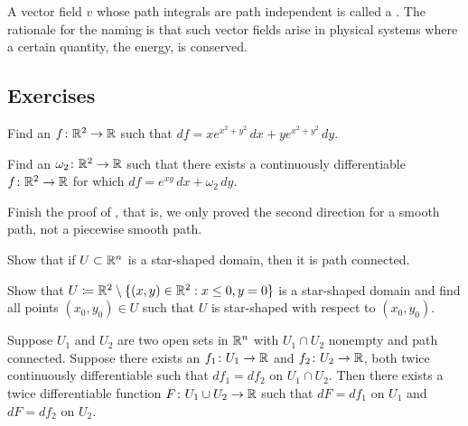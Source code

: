 A vector field $v$ whose path integrals are path independent is called
a \emph{}.  The rationale for the naming
is that such vector fields arise in physical systems
where a certain quantity, the energy, is conserved.

\subsection{Exercises}

\begin{exercise}
Find an $f \colon {\mathbb{R}}^2 \to {\mathbb{R}}$ such that $df = xe^{x^2+y^2}\, dx +
ye^{x^2+y^2} \, dy$.
\end{exercise}

\begin{exercise}
Find an $\omega_2 \colon {\mathbb{R}}^2 \to {\mathbb{R}}$ such that
there exists a continuously differentiable $f \colon {\mathbb{R}}^2 \to {\mathbb{R}}$
for which
$df = e^{xy} \,dx + \omega_2 \,dy$.
\end{exercise}

\begin{exercise}
Finish the proof of , that is, we only proved the
second direction for a smooth path, not a piecewise smooth path.
\end{exercise}

\begin{exercise}
Show that if $U \subset {\mathbb{R}}^n$ is a star-shaped domain,
then it is path connected.
\end{exercise}

\begin{exercise}
Show that $U \coloneqq {\mathbb{R}}^2 \setminus \{ (x,y) \in {\mathbb{R}}^2 : x \leq 0, y=0 \}$ is
a star-shaped domain and find all points $(x_0,y_0) \in U$ such that
$U$ is star-shaped with respect to $(x_0,y_0)$.
\end{exercise}

\begin{exercise}
Suppose $U_1$ and $U_2$ are two open sets in ${\mathbb{R}}^n$ with $U_1 \cap U_2$
nonempty and path connected.
Suppose there exists an $f_1 \colon U_1 \to {\mathbb{R}}$ and
$f_2 \colon U_2 \to {\mathbb{R}}$, both twice continuously differentiable
such that $d f_1 = d f_2$ on $U_1 \cap U_2$.
Then there exists a twice differentiable function $F \colon U_1 \cup U_2 \to
{\mathbb{R}}$ such that $dF = df_1$ on $U_1$ and $dF = df_2$ on $U_2$.
\end{exercise}

